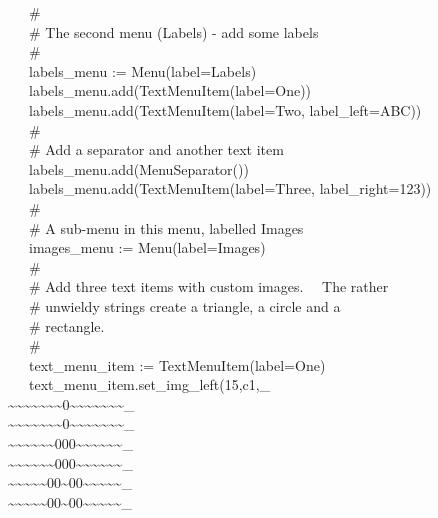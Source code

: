 {\>   \ \ \ \# \\
\>   \ \ \ \# The second menu ({\textquotedbl}Labels{\textquotedbl}) -
add some labels \\
\>   \ \ \ \# \\
\>   \ \ \ labels\_menu :=
Menu({\textquotedbl}label=Labels{\textquotedbl}) \\
\>   \ \ \ labels\_menu.add(TextMenuItem({\textquotedbl}label=One{\textquotedbl})) \\
\>   \ \ \ labels\_menu.add(TextMenuItem({\textquotedbl}label=Two{\textquotedbl},
{\textquotedbl}label\_left=ABC{\textquotedbl})) \\
\>   \ \ \ \# \\
\>   \ \ \ \# Add a separator and another text item \\
\>   \ \ \ labels\_menu.add(MenuSeparator()) \\
\>   \ \ \ labels\_menu.add(TextMenuItem({\textquotedbl}label=Three{\textquotedbl},
{\textquotedbl}label\_right=123{\textquotedbl})) \\
\>   \ \ \ \# \\
\>   \ \ \ \# A sub-menu in this menu, labelled
{\textquotedbl}Images{\textquotedbl} \\
\>   \ \ \ images\_menu :=
Menu({\textquotedbl}label=Images{\textquotedbl}) \\
\>   \ \ \ \# \\
\>   \ \ \ \# Add three text items with custom images. \ \ The rather \\
\>   \ \ \ \# unwieldy strings create a triangle, a circle and a \\
\>   \ \ \ \# rectangle. \\
\>   \ \ \ \# \\
\>   \ \ \ text\_menu\_item :=
TextMenuItem({\textquotedbl}label=One{\textquotedbl}) \\
\>   \ \ \ text\_menu\_item.set\_img\_left({\textquotedbl}15,c1,\_ \\
\~{}\~{}\~{}\~{}\~{}\~{}\~{}0\~{}\~{}\~{}\~{}\~{}\~{}\~{}\_ \\
\~{}\~{}\~{}\~{}\~{}\~{}\~{}0\~{}\~{}\~{}\~{}\~{}\~{}\~{}\_ \\
\~{}\~{}\~{}\~{}\~{}\~{}000\~{}\~{}\~{}\~{}\~{}\~{}\_ \\
\~{}\~{}\~{}\~{}\~{}\~{}000\~{}\~{}\~{}\~{}\~{}\~{}\_ \\
\~{}\~{}\~{}\~{}\~{}00\~{}00\~{}\~{}\~{}\~{}\~{}\_ \\
\~{}\~{}\~{}\~{}\~{}00\~{}00\~{}\~{}\~{}\~{}\~{}\_ \\
}
